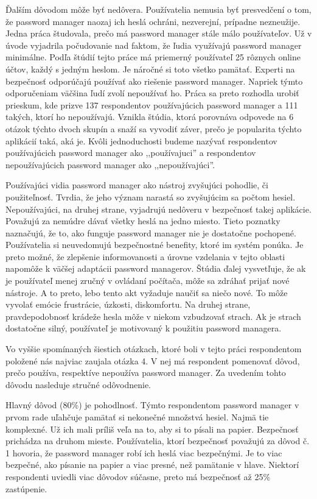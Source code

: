 Ďalším dôvodom môže byť nedôvera. Používatelia nemusia byť presvedčení o tom, že password manager naozaj ich heslá ochráni, nezverejní, prípadne nezneužije. Jedna práca \cite{survey3} študovala, prečo má password manager stále málo používateľov. Už v úvode vyjadrila počudovanie nad faktom, že ľudia využívajú password manager minimálne. Podľa štúdií tejto práce má priemerný používateľ 25 rôznych online účtov, každý s jedným heslom. Je náročné si toto všetko pamätať. Experti na bezpečnosť odporúčajú používať ako riešenie password manager. Napriek týmto odporučeniam väčšina ľudí zvolí nepoužívať ho. Práca sa preto rozhodla urobiť prieskum, kde prizve 137 respondentov používajúcich password manager a 111 takých, ktorí ho nepoužívajú. Vznikla štúdia, ktorá porovnáva odpovede na 6 otázok týchto dvoch skupín a snaží sa vyvodiť záver, prečo je popularita týchto aplikácií taká, aká je. Kvôli jednoduchosti budeme nazývať respondentov používajúcich password manager ako ,,používajuci'' a respondentov nepoužívajúcich password manager ako ,,nepoužívajúci''.

Používajúci vidia password manager ako nástroj zvyšujúci pohodlie, či použiteľnosť. Tvrdia, že jeho význam narastá so zvyšujúcim sa počtom hesiel. Nepoužívajúci, na druhej strane, vyjadrujú nedôveru v bezpečnosť takej aplikácie. Považujú za nemúdre dávať všetky heslá na jedno miesto. Tieto poznatky naznačujú, že to, ako funguje password manager nie je dostatočne pochopené. Používatelia si neuvedomujú bezpečnostné benefity, ktoré im systém ponúka. Je preto možné, že zlepšenie informovanosti a úrovne vzdelania v tejto oblasti napomôže k väčšej adaptácii password managerov. Štúdia ďalej vysvetľuje, že ak je používateľ menej zručný v ovládaní počítača, môže sa zdráhať prijať nové nástroje. A to preto, lebo tento akt vyžaduje naučiť sa niečo nové. To môže vyvolať emócie frustrácie, úzkosti, diskomfortu. Na druhej strane, pravdepodobnosť krádeže hesla môže v niekom vzbudzovať strach. Ak je strach dostatočne silný, používateľ je motivovaný k použitiu password managera.

Vo vyššie spomínaných šiestich otázkach, ktoré boli v tejto práci respondentom položené nás najviac zaujala otázka 4. V nej má respondent pomenovať dôvod, prečo používa, respektíve nepoužíva password manager. Za uvedením tohto dôvodu nasleduje stručné odôvodnenie.

Hlavný dôvod (80\%) je pohodlnosť. Týmto respondentom password manager v prvom rade uľahčuje pamätať si nekonečné množstvá hesiel. Najmä tie komplexné. Už ich mali príliš veľa na to, aby si to písali na papier. Bezpečnosť prichádza na druhom mieste. Používatelia, ktorí bezpečnosť považujú za dôvod č. 1 hovoria, že password manager robí ich heslá viac bezpečnými. Je to viac bezpečné, ako písanie na papier a viac presné, než pamätanie v hlave. Niektorí respondenti uviedli viac dôvodov súčasne, preto má bezpečnosť až 25\% zastúpenie.

